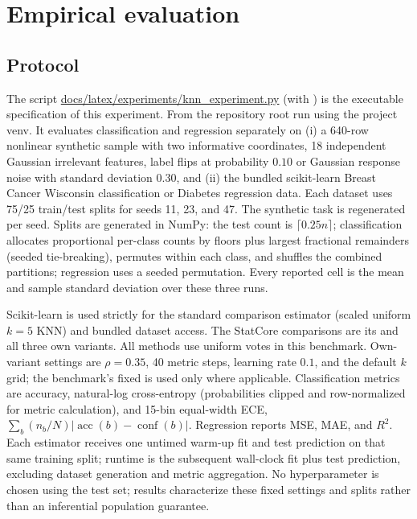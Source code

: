 \documentclass[conference]{IEEEtran}
\begin{document}
\section{Empirical evaluation}
\subsection{Protocol}
The script \url{docs/latex/experiments/knn_experiment.py} (with ) is the executable specification of this experiment. From the repository root run  using the project venv. It evaluates classification and regression separately on (i) a 640-row nonlinear synthetic sample with two informative coordinates, 18 independent Gaussian irrelevant features, label flips at probability $0.10$ or Gaussian response noise with standard deviation $0.30$, and (ii) the bundled scikit-learn Breast Cancer Wisconsin classification or Diabetes regression data. Each dataset uses 75/25 train/test splits for seeds 11, 23, and 47. The synthetic task is regenerated per seed. Splits are generated in NumPy: the test count is $\lceil0.25n\rceil$; classification allocates proportional per-class counts by floors plus largest fractional remainders (seeded tie-breaking), permutes within each class, and shuffles the combined partitions; regression uses a seeded permutation. Every reported cell is the mean and sample standard deviation over these three runs.

Scikit-learn is used strictly for the standard comparison estimator (scaled uniform $k=5$ KNN) and bundled dataset access. The StatCore comparisons are its  and all three own variants. All methods use uniform votes in this benchmark. Own-variant settings are $\rho=0.35$, 40 metric steps, learning rate $0.1$, and the default $k$ grid; the benchmark's fixed  is used only where applicable. Classification metrics are accuracy, natural-log cross-entropy (probabilities clipped and row-normalized for metric calculation), and 15-bin equal-width ECE, $\sum_b(n_b/N)|\operatorname{acc}(b)-\operatorname{conf}(b)|$. Regression reports MSE, MAE, and $R^2$. Each estimator receives one untimed warm-up fit and test prediction on that same training split; runtime is the subsequent wall-clock fit plus test prediction, excluding dataset generation and metric aggregation. No hyperparameter is chosen using the test set; results characterize these fixed settings and splits rather than an inferential population guarantee.
\end{document}
